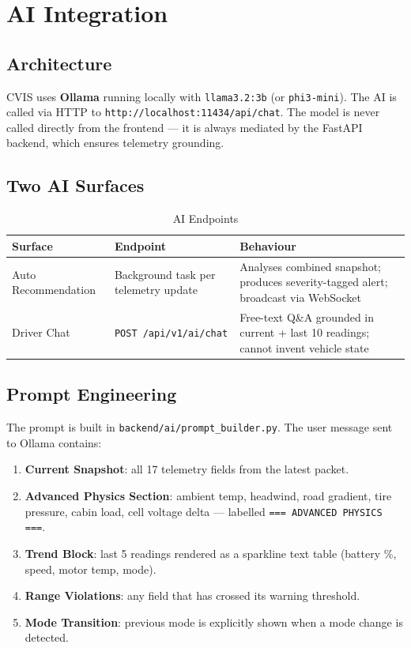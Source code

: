 \documentclass[12pt,a4paper]{report}
\begin{document}
\chapter{AI Integration}

\section{Architecture}

CVIS uses \textbf{Ollama} running locally with \texttt{llama3.2:3b} (or \texttt{phi3-mini}). The AI is called via HTTP to \texttt{http://localhost:11434/api/chat}. The model is never called directly from the frontend — it is always mediated by the FastAPI backend, which ensures telemetry grounding.

\section{Two AI Surfaces}

\begin{table}[H]
\centering
\caption{AI Endpoints}
\label{tab:ai}
\begin{tabularx}{\textwidth}{L{3.5cm} L{3.5cm} X}
\toprule
\textbf{Surface} & \textbf{Endpoint} & \textbf{Behaviour} \\
\midrule
Auto Recommendation & Background task per telemetry update & Analyses combined snapshot; produces severity-tagged alert; broadcast via WebSocket \\
Driver Chat & \texttt{POST /api/v1/ai/chat} & Free-text Q\&A grounded in current + last 10 readings; cannot invent vehicle state \\
\bottomrule
\end{tabularx}
\end{table}

\section{Prompt Engineering}

The prompt is built in \texttt{backend/ai/prompt\_builder.py}. The user message sent to Ollama contains:

\begin{enumerate}
  \item \textbf{Current Snapshot}: all 17 telemetry fields from the latest packet.
  \item \textbf{Advanced Physics Section}: ambient temp, headwind, road gradient, tire pressure, cabin load, cell voltage delta — labelled \texttt{=== ADVANCED PHYSICS ===}.
  \item \textbf{Trend Block}: last 5 readings rendered as a sparkline text table (battery \%, speed, motor temp, mode).
  \item \textbf{Range Violations}: any field that has crossed its warning threshold.
  \item \textbf{Mode Transition}: previous mode is explicitly shown when a mode change is detected.
\end{enumerate}
\end{document}
